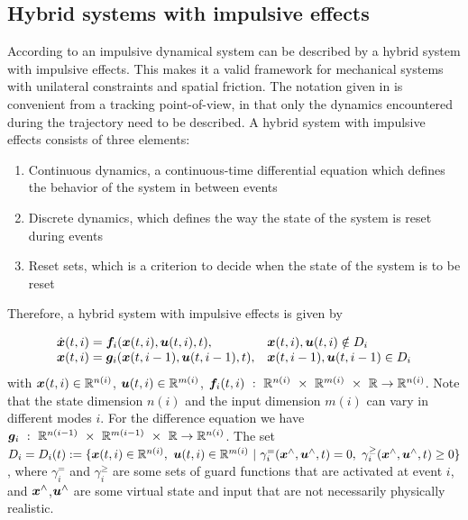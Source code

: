 \documentclass[../DC2017114Bouma.tex]{subfiles}
\begin{document}
\subsection{Hybrid systems with impulsive effects}
According to \cite{Haddad2006} an impulsive dynamical system can be described by a hybrid system with impulsive effects. This makes it a valid framework for mechanical systems with unilateral constraints and spatial friction. The notation given in \cite{Haddad2006} is convenient from a tracking point-of-view, in that only the dynamics encountered during the trajectory need to be described. A hybrid system with impulsive effects consists of three elements:
\begin{enumerate}
\item Continuous dynamics, a continuous-time differential equation which defines the behavior of the system in between events
\item Discrete dynamics, which defines the way the state of the system is reset during events
\item Reset sets, which is a criterion to decide when the state of the system is to be reset
\end{enumerate}

Therefore, a hybrid system with impulsive effects is given by

\begin{equation}
\begin{array}{ll}
\dot{{\boldsymbol{x}}}(t,i) ={\boldsymbol{f}}_i({\boldsymbol{x}}(t,i),{\boldsymbol{u}}(t,i),t),& {\boldsymbol{x}}(t,i),{\boldsymbol{u}}(t,i)\notin D_i\\
{\boldsymbol{x}}(t,i) = {\boldsymbol{g}}_i({\boldsymbol{x}}(t,i-1),{\boldsymbol{u}}(t,i-1),t),& {\boldsymbol{x}}(t,i-1),{\boldsymbol{u}}(t,i-1)\in D_i
\end{array}\label{eq:hybimp}
\end{equation}
with ${\boldsymbol{x}}(t,i)\in\mathbb{R}^{n(i)}$, ${\boldsymbol{u}}(t,i)\in\mathbb{R}^{m(i)}$, $\fb_i(t,i)\ :\ \Rbb^{n(i)}\ \times\ \Rbb^{m(i)}\ \times\ \Rbb\rightarrow \Rbb^{n(i)}$. Note that the state dimension $n(i)$ and the input dimension $m(i)$ can vary in different modes $i$. For the difference equation we have $\gb_i\ :\ \Rbb^{n(i-1)}\ \times\ \Rbb^{m(i-1)}\ \times\ \Rbb\rightarrow \Rbb^{n(i)}$. The set $D_i = D_i(t) := \{\xb(t,i)\in\Rbb^{n(i)},\ \ub(t,i)\in\Rbb^{m(i)}\ |\ \gamma^{=}_i(\xb^{\wedge},\ub^{\wedge},t) = 0, \ \gamma^{\geq}_i(\xb^{\wedge},\ub^{\wedge},t) \geq 0\}$, where $\gamma^{=}_i$ and $\gamma^{\geq}_i$ are some sets of guard functions that are activated at event $i$, and ${\boldsymbol{x}}^{\wedge}$,${\boldsymbol{u}}^{\wedge}$ are some virtual state and input that are not necessarily physically realistic.
\end{document}
